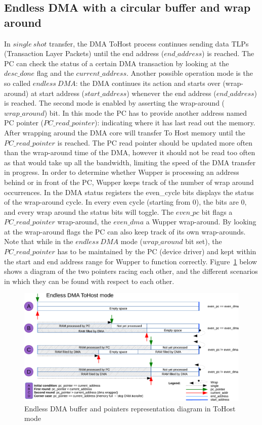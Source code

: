 \newpage
\subsection{Endless DMA with a circular buffer and wrap around}
\label{sec:endless_dma}
In $single\ shot$ transfer, the DMA ToHost process continues sending data TLPs (Transaction Layer Packets) until the end address ($end\_address$) is reached.
The PC can check the status of a certain DMA transaction by looking at the $desc\_done$ flag and the $current\_address$. Another possible operation mode is the so called $endless\ DMA$: the DMA continues its action and starts over (wrap-around) at start address ($start\_address$) whenever the end address ($end\_address$) is reached. The second mode is enabled by asserting the wrap-around ($wrap\_around$) bit. In this mode the PC has to provide another address named PC pointer ($PC\_read\_pointer$): indicating where it has last read out the memory. After wrapping around the DMA core will transfer To Host memory until the $PC\_read\_pointer$ is reached. The PC read pointer should be updated more often than the wrap-around time of the DMA, however it should not be read too often as that would take up all the bandwidth, limiting the speed of the DMA transfer in progress. In order to determine whether Wupper is processing an address behind or in front of the PC, Wupper keeps track of the number of wrap around occurrences. In the DMA status registers the even\_cycle bits displays the status of the wrap-around cycle. In every even cycle (starting from 0), the bits are 0, and every wrap around the status bits will toggle. The $even\_pc$ bit flags a $PC\_read\_pointer$ wrap-around, the $even\_dma$ a Wupper wrap-around. By looking at the wrap-around flags the PC can also keep track of its own wrap-arounds. Note that while in the $endless\ DMA$ mode ($wrap\_around$ bit set), the $PC\_read\_pointer$ has to be maintained by the PC (device driver) and kept within the start and end address range for Wupper to function correctly. Figure~\ref{fig:endless_dma_diagram_tohost} below shows a diagram of the two pointers racing each other, and the different scenarios in which they can be found with respect to each other. 
\newpage
\begin{figure}[H]
\centering
\includegraphics[width=1\textwidth, page=1]{figures/Endless_DMA_diagram.pdf}
\caption{Endless DMA buffer and pointers representation diagram in ToHost mode}
\label{fig:endless_dma_diagram_tohost}
\end{figure}

